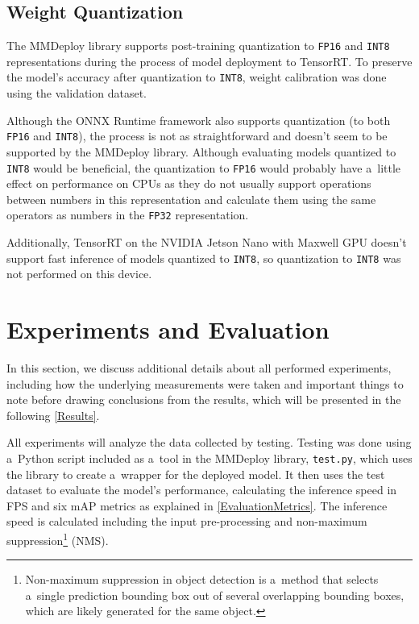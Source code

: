 \subsection*{Weight Quantization}

The MMDeploy library supports post-training quantization to \texttt{FP16} and
\texttt{INT8} representations during the process of model deployment to
TensorRT. To preserve the model's accuracy after quantization to \texttt{INT8},
weight calibration was done using the validation dataset.

Although the ONNX Runtime framework also supports quantization (to both
\texttt{FP16} and \texttt{INT8}), the process is not as straightforward and
doesn't seem to be supported by the MMDeploy library. Although evaluating models
quantized to \texttt{INT8} would be beneficial, the quantization to
\texttt{FP16} would probably have a~little effect on performance on CPUs as they
do not usually support operations between numbers in this representation and
calculate them using the same operators as numbers in the \texttt{FP32}
representation.

Additionally, TensorRT on the NVIDIA Jetson Nano with Maxwell GPU doesn't
support fast inference of models quantized to \texttt{INT8}, so quantization to
\texttt{INT8} was not performed on this device.


\section{Experiments and Evaluation}

In this section, we discuss additional details about all performed experiments,
including how the underlying measurements were taken and important things to
note before drawing conclusions from the results, which will be presented in
the following \autoref{Results}.

All experiments will analyze the data collected by testing. Testing was done using
a~Python script included as a~tool in the MMDeploy library, \texttt{test.py},
which uses the library to create a~wrapper for the deployed model. It then uses
the test dataset to evaluate the model's performance, calculating the
inference speed in FPS and six mAP metrics as explained in
\autoref{EvaluationMetrics}. The inference speed is calculated including the
input pre-processing and non-maximum suppression\footnote{Non-maximum
suppression in object detection is a~method that selects a~single prediction
bounding box out of several overlapping bounding boxes, which are likely
generated for the same object.} (NMS).

